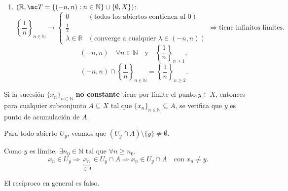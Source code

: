 \begin{ejems}
\begin{enumerate}
        \item \((\mathbb{R}, \mc T = \{ (-n, n) : n \in \mathbb{N} \} \cup \{ \emptyset, X \})\):
        \[
             \left\{\frac{1}{n}\right\}_{n \in \mathbb{N}} \longrightarrow
            \begin{cases}
                0 & (\text{todos los abiertos contienen al } 0) \\
                \frac{1}{2} & \\
                \lambda \in \mathbb{R} & (\text{converge a cualquier } \lambda \in (-n, n))
            \end{cases}
            \Rightarrow \text{tiene infinitos límites.}
        \]
        \[
            (-n, n) \quad \forall n \in \mathbb{N} \quad \text{y} \quad  \left\{\frac{1}{n}\right\}_{n \ge 1},
        \]
        \[
            (-n, n) \cap  \left\{\frac{1}{n}\right\}_{n \in \mathbb{N}} =  \left\{\frac{1}{n}\right\}_{n \ge 2}.
        \]
    \end{enumerate}
\end{ejems}

\begin{prop}
    Si la sucesión \(\{x_n\}_{n \in \mathbb{N}}\) \textbf{no constante} tiene por límite el punto \(y \in X\), entonces para cualquier subconjunto \(A \subseteq X\) tal que \(\{x_n\}_{n \in \mathbb{N}} \subseteq A\), se verifica que \(y\) es punto de acumulación de \(A\).
\end{prop}

\begin{dem}
    Para todo abierto \(U_y\), veamos que \((U_y \cap A) \setminus \{y\} \ne \emptyset\).
    
    Como \(y\) es límite, \(\exists n_0 \in \mathbb{N}\) tal que \(\forall n \ge n_0\),
    \[
        x_n \in U_y \Rightarrow \underbrace{x_n}_{\in A} \in U_y \cap A \Rightarrow x_n \in U_y \cap A \quad \text{con } x_n \ne y.
    \]
\end{dem}

\begin{obs}
    El recíproco en general es falso.
\end{obs}

